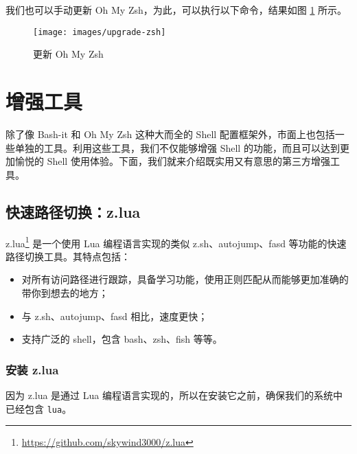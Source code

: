 \documentclass[]{ctexbook}
\newenvironment{Shaded}{\begin{snugshade}}{\end{snugshade}}
\newcommand{\ExtensionTok}[1]{#1}
\newcommand{\NormalTok}[1]{#1}
\providecommand{\tightlist}{%
  \setlength{\itemsep}{0pt}\setlength{\parskip}{0pt}}
\renewcommand{\href}[2]{#2\footnote{\url{#1}}}
\begin{document}
我们也可以手动更新 Oh My Zsh，为此，可以执行以下命令，结果如图 \ref{fig:upgrade-zsh} 所示。

\begin{Shaded}
\end{Shaded}

\begin{figure}
\texttt{[image: images/upgrade-zsh]} \caption{更新 Oh My Zsh}\label{fig:upgrade-zsh}
\end{figure}

\hypertarget{ux589eux5f3aux5de5ux5177}{%
\section{增强工具}\label{ux589eux5f3aux5de5ux5177}}

除了像 Bash-it 和 Oh My Zsh 这种大而全的 Shell 配置框架外，市面上也包括一些单独的工具。利用这些工具，我们不仅能够增强 Shell 的功能，而且可以达到更加愉悦的 Shell 使用体验。下面，我们就来介绍既实用又有意思的第三方增强工具。

\hypertarget{ux5febux901fux8defux5f84ux5207ux6362z.lua}{%
\subsection{快速路径切换：z.lua}\label{ux5febux901fux8defux5f84ux5207ux6362z.lua}}

\href{https://github.com/skywind3000/z.lua}{z.lua} 是一个使用 Lua 编程语言实现的类似 z.sh、autojump、fasd 等功能的快速路径切换工具。其特点包括：

\begin{itemize}
\tightlist
\item
  对所有访问路径进行跟踪，具备学习功能，使用正则匹配从而能够更加准确的带你到想去的地方；
\item
  与 z.sh、autojump、fasd 相比，速度更快；
\item
  支持广泛的 shell，包含 bash、zsh、fish 等等。
\end{itemize}

\hypertarget{ux5b89ux88c5-z.lua}{%
\subsubsection{安装 z.lua}\label{ux5b89ux88c5-z.lua}}

因为 z.lua 是通过 Lua 编程语言实现的，所以在安装它之前，确保我们的系统中已经包含 \texttt{lua}。
\end{document}
